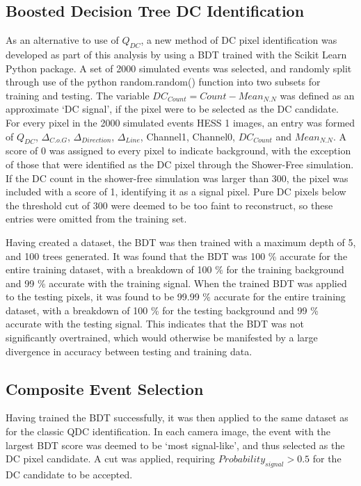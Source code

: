 \documentclass{article}
\begin{document}
\subsection{Boosted Decision Tree DC Identification}  As an alternative to use of $Q_{DC}$, a new method of DC pixel identification was developed as part of this analysis by using a BDT trained with the Scikit Learn Python package. A set of 2000 simulated events was selected, and randomly split through use of the python random.random() function into two subsets for training and testing. The variable $DC_{Count} = Count-Mean_{N.N}$ was defined as an approximate \textquoteleft DC signal', if the pixel were to be selected as the DC candidate. For every pixel in the 2000 simulated events HESS 1 images, an entry was formed of $Q_{DC}$, $ \Delta_{C.o.G}$, $\Delta_{Direction}$, $\Delta_{Line}$, Channel1, Channel0, $DC_{Count}$ and $Mean_{N.N}$. A score of 0 was assigned to every pixel to indicate background, with the exception of those that were identified as the DC pixel through the Shower-Free simulation. If the DC count in the shower-free simulation was larger than 300, the pixel was included with a score of 1, identifying it as a signal pixel. Pure DC pixels below the threshold cut of 300 were deemed to be too faint to reconstruct, so these entries were omitted from the training set.

Having created a dataset, the BDT was then trained with a maximum depth of 5, and 100 trees generated. It was found that the BDT was 100 \% accurate for the entire training dataset, with a breakdown of 100 \% for the training background and 99 \% accurate with the training signal. When the trained BDT was applied to the testing pixels, it was found to be 99.99 \%  accurate for the entire training dataset, with a breakdown of 100 \% for the testing background and 99 \% accurate with the testing signal. This indicates that the BDT was not significantly overtrained, which would otherwise be manifested by a large divergence in accuracy between testing and training data.

\subsection{Composite Event Selection}
Having trained the BDT successfully, it was then applied to the same dataset as for the classic QDC identification. In each camera image, the event with the largest BDT score was deemed to be \textquoteleft most signal-like', and thus selected as the DC pixel candidate. A cut was applied, requiring $Probability_{signal} > 0.5$ for the DC candidate to be accepted. 
\end{document}
